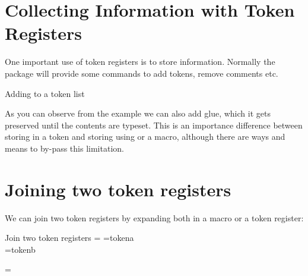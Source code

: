 \section{Collecting Information with Token Registers}

One important use of token registers is to store information. Normally the package will provide some commands to add tokens, remove comments etc.

\begin{teXXX}
\def\addinfo #1{%
    \expandafter\expandafter\expandafter\collecttokens\expandafter{%
          \the\collecttokens #1}
}
\end{teXXX}


\begin{texexample}{Adding to a token list}{}
\bgroup
\makeatletter
\def\addinfo #1{
    \expandafter\expandafter\expandafter\@temptokena\expandafter{%
          \the\@temptokena #1}
}

\addinfo{\hfill}
\addinfo{CHAPTER}
\addinfo{\kern0.5em}
\addinfo{\thechapter}
\the\@temptokena
\makeatother
\egroup
\end{texexample}


As you can observe from the example we can also add glue, which it gets preserved until the contents are typeset. This is an importance difference between storing in a token and storing using \cmd{\edef} or a macro, although there are ways and means to by-pass this limitation.

\section{Joining two token registers}

We can join two token registers by expanding both in a macro or a token register:

\begin{texexample}{Join two token registers}{}
\makeatletter
\bgroup
{}={}
\newtoks\@temptokenb
\@temptokena={tokena\\ }
\@temptokenb={tokenb}

\def\jointoks#1#2#3{%
#1=\expandafter\expandafter\expandafter
{\expandafter\the\expandafter#2\the#3}}

\jointoks{}{\@temptokena}{\@temptokenb}

\the{} 
\egroup
\makeatother
\end{texexample}




